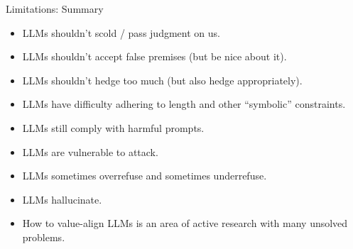 \documentclass[11pt,compress,t,notes=noshow, xcolor=table]{beamer}
\begin{document}




\begin{vbframe}{Limitations: Summary}

\vfill

\begin{itemize}
 

\item LLMs shouldn't scold / pass judgment on us.

\item LLMs shouldn't accept false premises (but be nice
  about it).

  \item LLMs shouldn't hedge too much (but also hedge appropriately).

  \item LLMs have difficulty adhering to length and other
    ``symbolic'' constraints.

    \item LLMs still comply with harmful prompts.

      \item LLMs are vulnerable to attack.

      \item LLMs sometimes overrefuse and sometimes underrefuse.

\item LLMs hallucinate.
        
\item How to value-align LLMs is an area of active research with
  many unsolved problems.

\end{itemize}


\vfill

\end{vbframe}
\end{document}
